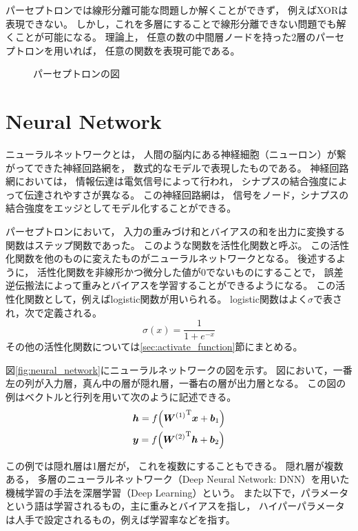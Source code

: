\documentclass[class=jsarticle, crop=false, dvipdfmx, fleqn]{standalone}
\begin{document}
パーセプトロンでは線形分離可能な問題しか解くことができず，
例えばXORは表現できない。
しかし，これを多層にすることで線形分離できない問題でも解くことが可能になる。
理論上，
任意の数の中間層ノードを持った2層のパーセプトロンを用いれば，%
任意の関数を表現可能である。

\begin{figure}
	\centering
	
	\caption{パーセプトロンの図}
	\label{fig:perceptron}
\end{figure}



\section{Neural Network}
\label{sec:neural_network}

ニューラルネットワークとは，
人間の脳内にある神経細胞（ニューロン）が繋がってできた神経回路網を，
数式的なモデルで表現したものである。
神経回路網においては，
情報伝達は電気信号によって行われ，
シナプスの結合強度によって伝達されやすさが異なる。
この神経回路網は，
信号をノード，シナプスの結合強度をエッジとしてモデル化することができる。

パーセプトロンにおいて，
入力の重みづけ和とバイアスの和を出力に変換する関数はステップ関数であった。
このような関数を活性化関数と呼ぶ。
この活性化関数を他のものに変えたものがニューラルネットワークとなる。
後述するように，
活性化関数を非線形かつ微分した値が0でないものにすることで，
誤差逆伝搬法によって重みとバイアスを学習することができるようになる。
この活性化関数として，例えばlogistic関数が用いられる。
logistic関数はよく$\sigma$で表され，次で定義される。
\begin{equation}
\sigma (x) = \frac{1}{1 + e^{-x}}
\end{equation}
その他の活性化関数については\ref{sec:activate_function}節にまとめる。

図\ref{fig:neural_network}にニューラルネットワークの図を示す。
図において，一番左の列が入力層，真ん中の層が隠れ層，一番右の層が出力層となる。
この図の例はベクトルと行列を用いて次のように記述できる。
\begin{align}
& \bm{h} = f\qty({\bm{W}^{(1)}}^{\mathrm{T}} \bm{x} + \bm{b}_1) \\
& \bm{y} = f\qty({\bm{W}^{(2)}}^{\mathrm{T}} \bm{h} + \bm{b}_2)
\end{align}

この例では隠れ層は1層だが，
これを複数にすることもできる。
隠れ層が複数ある，
多層のニューラルネットワーク（Deep Neural Network: DNN）を用いた
機械学習の手法を深層学習（Deep Learning）という。
また以下で，パラメータという語は学習されるもの，主に重みとバイアスを指し，
ハイパーパラメータは人手で設定されるもの，例えば学習率などを指す。
\end{document}
